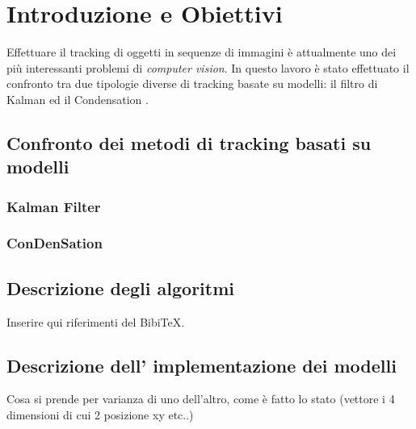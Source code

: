 
\chapter{Introduzione e Obiettivi}
Effettuare il tracking di oggetti in sequenze di immagini è attualmente uno dei più interessanti problemi di \textit{computer vision}. In questo lavoro è stato effettuato il confronto tra due tipologie diverse di tracking basate su modelli: il filtro di Kalman \cite{kalman-intro} ed il Condensation \cite{condensation}.
\section{Confronto dei metodi di tracking basati su modelli}
\subsection{Kalman Filter}
\subsection{ConDenSation}
\section{Descrizione degli algoritmi}
Inserire qui riferimenti del  Bibi\TeX.
\section{Descrizione dell' implementazione dei modelli}
Cosa si prende per varianza di uno dell'altro, come è fatto lo stato (vettore i 4 dimensioni di cui 2 posizione xy etc..)
